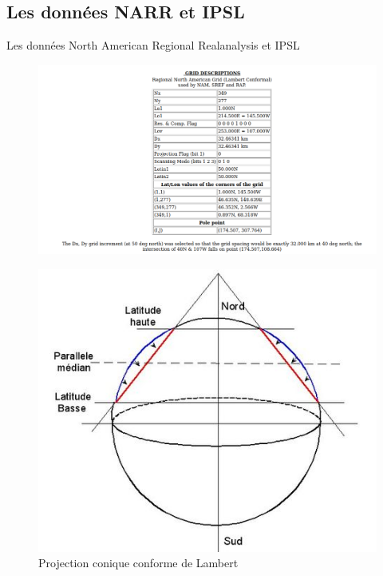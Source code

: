 \documentclass{beamer}
\numberwithin{equation}{section}
\begin{document}
	\subsection{Les données NARR et IPSL}
	\begin{frame}{Les données North American Regional Realanalysis et IPSL}
		\begin{minipage}[b]{0.5\linewidth}
			\begin{figure}[H]
				\begin{center}
					\includegraphics[scale=0.12]{grid_prop.png}
				\end{center}
				\label{fig-maillage NARR}
			\end{figure}
		\end{minipage}\hfill
		\begin{minipage}[b]{0.5\linewidth}
			\begin{figure}[H]
				\label{fig-proj Lambert}
				\begin{center}
					\includegraphics[scale=0.3]{lambert.jpg}
				\end{center}
				\caption{Projection conique conforme de Lambert}
			\end{figure}
		\end{minipage}	
	\end{frame}
	
\end{document}
